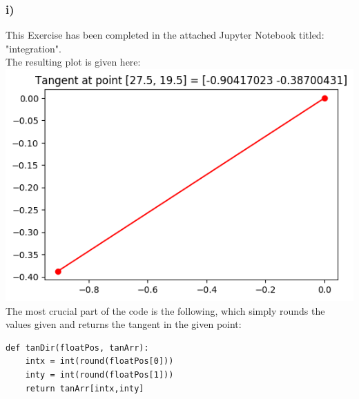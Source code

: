 \subsubsection{i)}
This Exercise has been completed in the attached Jupyter Notebook titled: "integration".\\
The resulting plot is given here:\\
\includegraphics[width=0.75\linewidth]{tanpoint2820}\\
The most crucial part of the code is the following, which simply rounds the values given and returns the tangent in the given point:
\begin{verbatim}
def tanDir(floatPos, tanArr):
    intx = int(round(floatPos[0]))
    inty = int(round(floatPos[1]))
    return tanArr[intx,inty]
\end{verbatim}
